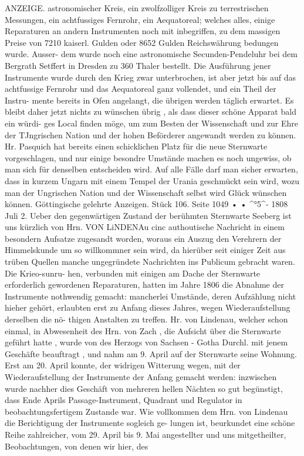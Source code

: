 \documentclass[12pt,a4paper]{article}
\begin{document}
ANZEIGE. astronomischer  Kreis,  ein  zwolfzolliger  Kreis  zu  terrestrischen  Messungen,  ein  achtfussiges  Fernrohr, ein  Aequatoreal;  welches  alles,  einige  Reparaturen  an  andern  Instrumenten  noch  mit  inbegriffen,  zu dem  massigen  Preise  von  7210  kaiserl.  Gulden  oder  8652  Gulden  Reichswährung  bedungen  wurde.  Ausser- dem wurde  noch  eine  astronomische  Secunden-Pendeluhr  bei  dem  Bergrath  Setffert  in  Dresden  zu  360 Thaler  bestellt.  Die  Ausführung  jener  Instrumente  wurde  durch  den  Krieg  zwar  unterbrochen,  ist  aber jetzt  bis  auf  das  achtfussige  Fernrohr  und  das  Aequatoreal  ganz  vollendet,  und  ein  Theil  der  Instru- mente bereits  in  Ofen  angelangt,  die  übrigen  werden  täglich  erwartet. Es  bleibt  daher  jetzt  nichts  zu  wünschen  übrig ,  als  dass  dieser  schöne  Apparat  bald  ein  würdi- ges Local  finden  möge,  um  zum  Besten  der  Wissenschaft  und  zur  Ehre  der  TJngrischen  Nation  und  der hohen  Beförderer  angewandt  werden  zu  können.  Hr.  Pasquich  hat  bereits  einen  schicklichen  Platz  für die  neue  Sternwarte  vorgeschlagen,  und  nur  einige  besondre  Umstände  machen  es  noch  ungewiss,  ob man  sich  für  denselben  entscheiden  wird.  Auf  alle  Fälle  darf  man  sicher  erwarten,  dass  in  kurzem Ungarn  mit  einem  Tempel  der  Urania  geschmückt  sein  wird,  wozu  man  der  Ungrischen  Nation  und  der Wissenschaft  selbst  wird  Glück  wünschen  können. Göttingische  gelehrte  Anzeigen.     Stück  106.     Seite  1049  •  •  \textasciicircum{}°5\textasciicircum{}-     1808  Juli  2. Ueber  den  gegenwärtigen  Zustand  der  berühmten  Sternwarte  Seeberg  ist  uns  kürzlich  von  Hrn. VON  LiNDENAu  cinc  authoutische  Nachricht  in  einem  besondern  Aufsatze  zugesandt  worden,  woraus  ein Auszug  den  Verehrern  der  Himmelskunde  um  so  willkommner  sein  wird,  da  hierüber  seit  einiger  Zeit aus  trüben  Quellen  manche  ungegründete  Nachrichten  ins  Publicum  gebracht  waren.  Die  Krieo-sunru- hen,  verbunden  mit  einigen  am  Dache  der  Sternwarte  erforderlich  gewordenen  Reparaturen,  hatten  im Jahre  1806  die  Abnahme  der  Instrumente  nothwendig  gemacht:  mancherlei  Umstände,  deren  Aufzählung nicht  hieher  gehört,  erlaubten  erst  zu  Anfang  dieses  Jahres,  wegen  Wiederaufstellung  derselben  die  nö- thigen  Anstalten  zu  treffen.  Hr.  von  Lindenau,  welcher  schon  einmal,  in  Abwesenheit  des  Hrn.  von Zach  ,  die  Aufsicht  über  die  Sternwarte  geführt  hatte ,  wurde  von  des  Herzogs  von  Sachsen  -  Gotha Durchl.  mit  jenem  Geschäfte  beauftragt ,  und  nahm  am  9.  April  auf  der  Sternwarte  seine  Wohnung. Erst  am  20.  April  konnte,  der  widrigen  Witterung  wegen,  mit  der  Wiederaufstellung  der  Instrumente der  Anfang  gemacht  werden:  inzwischen  wurde  nachher  dies  Geschäft  von  mehreren  hellen  Nächten  so gut  begünstigt,  dass  Ende  Aprils  Passage-Instrument,  Quadrant  und  Regulator  in  beobachtungsfertigem Zustande  war.  Wie  vollkommen  dem  Hrn.  von  Lindenau  die  Berichtigung  der  Instrumente  sogleich  ge- lungen ist,  beurkundet  eine  schöne  Reihe  zahlreicher,  vom  29.  April  bis  9.  Mai  angestellter  und  uns mitgetheilter,  Beobachtungen,  von  denen  wir  hier,  des  
\end{document}
